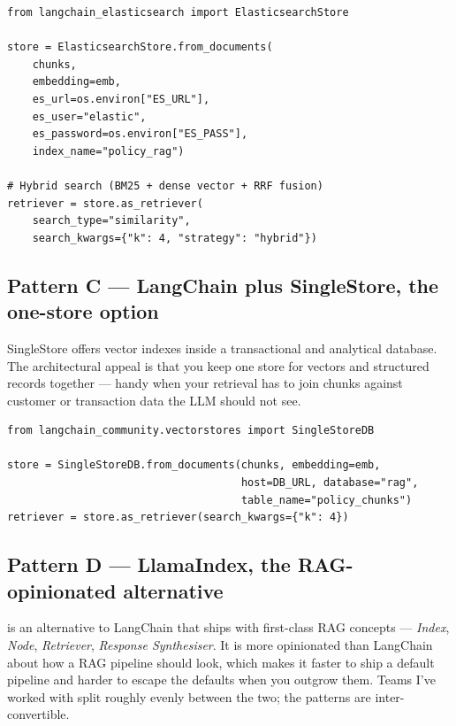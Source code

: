 \begin{examplebox}[title=\textbf{Elasticsearch-backed retriever}]
\begin{lstlisting}[style=pythonstyle]
from langchain_elasticsearch import ElasticsearchStore

store = ElasticsearchStore.from_documents(
    chunks,
    embedding=emb,
    es_url=os.environ["ES_URL"],
    es_user="elastic",
    es_password=os.environ["ES_PASS"],
    index_name="policy_rag")

# Hybrid search (BM25 + dense vector + RRF fusion)
retriever = store.as_retriever(
    search_type="similarity",
    search_kwargs={"k": 4, "strategy": "hybrid"})
\end{lstlisting}
\end{examplebox}

\subsection{Pattern C --- LangChain plus SingleStore, the one-store option}

SingleStore offers vector indexes inside a transactional and analytical database. The architectural appeal is that you keep one store for vectors and structured records together --- handy when your retrieval has to join chunks against customer or transaction data the LLM should not see.

\begin{examplebox}[title=\textbf{SingleStore-backed retriever}]
\begin{lstlisting}[style=pythonstyle]
from langchain_community.vectorstores import SingleStoreDB

store = SingleStoreDB.from_documents(chunks, embedding=emb,
                                     host=DB_URL, database="rag",
                                     table_name="policy_chunks")
retriever = store.as_retriever(search_kwargs={"k": 4})
\end{lstlisting}
\end{examplebox}

\subsection{Pattern D --- LlamaIndex, the RAG-opinionated alternative}

 is an alternative to LangChain that ships with first-class RAG concepts --- \emph{Index}, \emph{Node}, \emph{Retriever}, \emph{Response Synthesiser}. It is more opinionated than LangChain about how a RAG pipeline should look, which makes it faster to ship a default pipeline and harder to escape the defaults when you outgrow them. Teams I've worked with split roughly evenly between the two; the patterns are inter-convertible.

